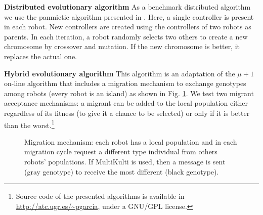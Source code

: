 \documentclass[runningheads]{llncs}
\begin{document}
{\bf Distributed evolutionary algorithm}
As a benchmark distributed algorithm we use the panmictic algorithm presented in \cite{HUIJSMAN11}. Here, a single controller is present in each robot. New controllers are created using the controllers of two robots as parents. In each iteration, a robot randomly selects two others to create a new chromosome by crossover and mutation. If the new chromosome is better, it replaces the actual one.


{\bf Hybrid evolutionary algorithm}
This algorithm is an adaptation of the $\mu+1$ on-line algorithm that
includes a migration mechanism to exchange genotypes among robots
(every robot is an island) as shown in
Fig. \ref{fig:panmicticmultikulti}. We test two migrant acceptance
mechanisms: a migrant can be added to the local population either
regardless of its fitness (to give it a chance to be selected) or only
if it is better than the worst.\footnote{Source code of the presented
  algorithms is available in \url{http://atc.ugr.es/~pgarcia}, under a
  GNU/GPL license.} 

\begin{figure}[t!]
\begin{center}
\centerline{ 
%
}
\end{center}
\vspace{-24pt}
\caption{Migration mechanism: each robot has a local population and in each migration cycle request a different type individual from others robots' populations. If MultiKulti is used, then a message is sent (gray genotype) to receive the most different (black genotype).}
\vspace{-18pt}
\label{fig:panmicticmultikulti}
\end{figure}
\end{document}
